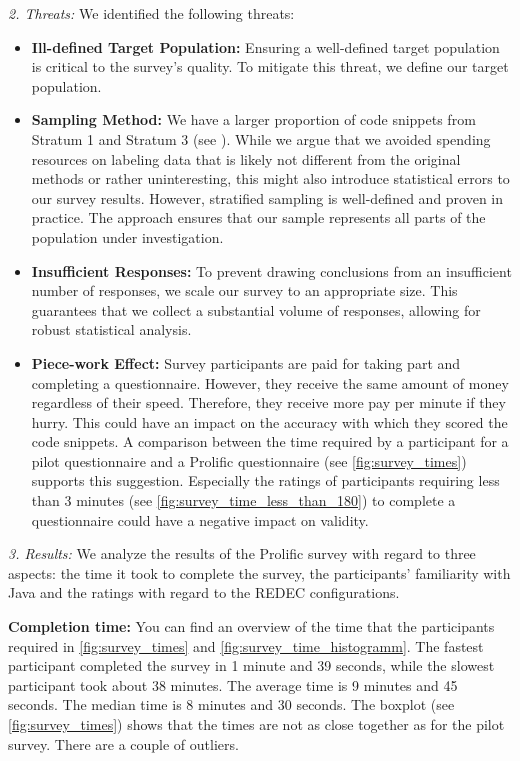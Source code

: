\documentclass[%
class=scrreprt,
chapterprefix=false,%
open=right,%
twoside=false,%
paper=a4,%
logofile={Logo\_zentral\_farbig\_EN.png},%
thesistype=master,%
UKenglish,%
]{se2thesis}
\theoremstyle{definition}
\newcommand{\rdh}{REDEC\xspace}
\begin{document}
\textit{2. Threats:}
	We identified the following threats:
	\begin{itemize}
		\item \textbf{Ill-defined Target Population:} Ensuring a well-defined target population is critical to the survey's quality. To mitigate this threat, we define our target population.
		
		\item \textbf{Sampling Method:} We have a larger proportion of code snippets from Stratum 1 and Stratum 3 (see ). While we argue that we avoided spending resources on labeling data that is likely not different from the original methods or rather uninteresting, this might also introduce statistical errors to our survey results.
		However, stratified sampling is well-defined and proven in practice. The approach ensures that our sample represents all parts of the population under investigation.
		
		\item \textbf{Insufficient Responses:} To prevent drawing conclusions from an insufficient number of responses, we scale our survey to an appropriate size. This guarantees that we collect a substantial volume of responses, allowing for robust statistical analysis.
		
		\item \textbf{Piece-work Effect:} Survey participants are paid for taking part and completing a questionnaire. However, they receive the same amount of money regardless of their speed. Therefore, they receive more pay per minute if they hurry. This could have an impact on the accuracy with which they scored the code snippets. A comparison between the time required by a participant for a pilot questionnaire and a Prolific questionnaire (see \autoref{fig:survey_times}) supports this suggestion. Especially the ratings of participants requiring less than 3 minutes (see \autoref{fig:survey_time_less_than_180}) to complete a questionnaire could have a negative impact on validity. 
		
	\end{itemize}
	
\textit{3. Results:}
	We analyze the results of the Prolific survey with regard to three aspects: the time it took to complete the survey, the participants' familiarity with Java and the ratings with regard to the \rdh configurations.

	\textbf{Completion time:}
	You can find an overview of the time that the participants required in \autoref{fig:survey_times} and \autoref{fig:survey_time_histogramm}.
	The fastest participant completed the survey in 1 minute and 39 seconds, while the slowest participant took about 38 minutes. 
	The average time is 9 minutes and 45 seconds. The median time is 8 minutes and 30 seconds. The boxplot (see \autoref{fig:survey_times}) shows that the times are not as close together as for the pilot survey. There are a couple of outliers.
	
\end{document}
